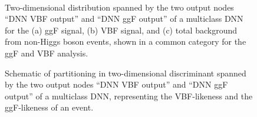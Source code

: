 \begin{figure}[ht]
    \centering
     \\
    \caption{Two-dimensional distribution spanned by the two output nodes ``DNN VBF output'' and ``DNN ggF output'' of a multiclass DNN for the (a) ggF signal, (b) VBF signal, and (c) total background from non-Higgs boson events, shown in a common \TwoJet category for the ggF \TwoJet and VBF analysis.}
    \label{app:fig:2d-discriminant} 
\end{figure}

\begin{figure}[t]
    \caption{Schematic of partitioning in two-dimensional discriminant spanned by the two output nodes ``DNN VBF output'' and ``DNN ggF output'' of a multiclass DNN, representing the VBF-likeness and the ggF-likeness of an event.}
    \label{app:hwwejet-schematic-partitioning}
\end{figure}


